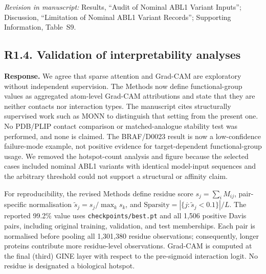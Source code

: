 \documentclass[11pt,a4paper]{article}
\newcommand{\response}{\noindent\textbf{Response.} }
\newcommand{\change}[1]{\par\smallskip\noindent\textit{Revision in manuscript:} #1\par\medskip}
\begin{document}
\change{Results, ``Audit of Nominal ABL1 Variant Inputs''; Discussion,
``Limitation of Nominal ABL1 Variant Records''; Supporting Information,
Table~S9.}

\subsection*{R1.4. Validation of interpretability analyses}


\response We agree that sparse attention and Grad-CAM are exploratory without
independent supervision.  The Methods now define functional-group values as
aggregated atom-level Grad-CAM attributions and state that they are neither
contacts nor interaction types.  The manuscript cites structurally supervised
work such as MONN to distinguish that setting from the present one.  No
PDB/PLIP contact comparison or matched-analogue stability test was performed,
and none is claimed.  The BRAF/D0023 result is now a low-confidence
failure-mode example, not positive evidence for target-dependent functional-group
usage.  We removed the hotspot-count analysis and figure because the selected
cases included nominal ABL1 variants with identical model-input sequences and
the arbitrary threshold could not support a structural or affinity claim.

For reproducibility, the revised Methods define residue score
$s_j=\sum_i M_{ij}$, pair-specific normalisation
$\widetilde{s}_j=s_j/\max_k s_k$, and
$\mathrm{Sparsity}=|\{j:\widetilde{s}_j<0.1\}|/L$. The reported 99.2\% value
uses \texttt{checkpoints/best.pt} and all 1,506 positive Davis pairs, including
original training, validation, and test memberships. Each pair is normalised
before pooling all 1,301,380 residue observations; consequently, longer proteins
contribute more residue-level observations. Grad-CAM is computed at the final
(third) GINE layer with respect to the pre-sigmoid interaction logit. No residue
is designated a biological hotspot.
\end{document}
